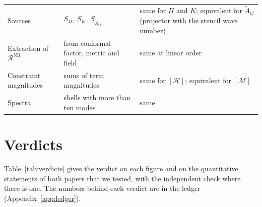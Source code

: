 \documentclass[aps,prd,twocolumn,10pt,superscriptaddress,nofootinbib,longbibliography,floatfix]{revtex4-2}
\newcommand{\Ham}{\mathcal{H}}
\newcommand{\Mom}{\mathcal{M}}
\begin{document}
\begin{table}
\begin{tabular}{p{}p{}p{}}
Sources & $S_\Pi$, $S_K$, $S_{\tilde A_{ij}}$ & same for $\Pi$ and $K$; equivalent for $\tilde A_{ij}$ (projector with the stencil wave number) \\
Extraction of $\mathcal{R}^\mathrm{NR}$ & from conformal factor, metric and field & same at linear order \\
Constraint magnitudes & sums of term magnitudes & same for $[\Ham]$; equivalent for $[\Mom]$ \\
Spectra & shells with more than ten modes & same \\
\bottomrule
\end{tabular}
\end{table}

\section{Verdicts}\label{app:verdicts}

Table~\ref{tab:verdicts} gives the verdict on each figure and on the quantitative statements of both papers that we tested, with the independent check where there is one. The numbers behind each verdict are in the ledger (Appendix~\ref{app:ledger}).
\end{document}

